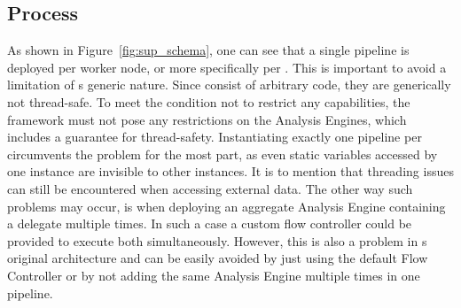 \subsection{Process}
As shown in Figure~\ref{fig:sup_schema}, one can see that a single pipeline is deployed per worker node, or more specifically per \jvm{}. This is important to avoid a limitation of \uima{}s generic nature. Since \anens{} consist of arbitrary code, they are generically not thread-safe. To meet the condition not to restrict any \uima{} capabilities, the framework must not pose any restrictions on the Analysis Engines, which includes a guarantee for thread-safety. Instantiating exactly one pipeline per \jvm{} circumvents the problem for the most part, as even static variables accessed by one instance are invisible to other instances. It is to mention that threading issues can still be encountered when accessing external data. The other way such problems may occur, is when deploying an aggregate Analysis Engine containing a delegate \anen{} multiple times. In such a case a custom flow controller could be provided to execute both \anens{} simultaneously. However, this is also a problem in \uima{}s original architecture and can be easily avoided by just using the default Flow Controller or by not adding the same Analysis Engine multiple times in one pipeline.

